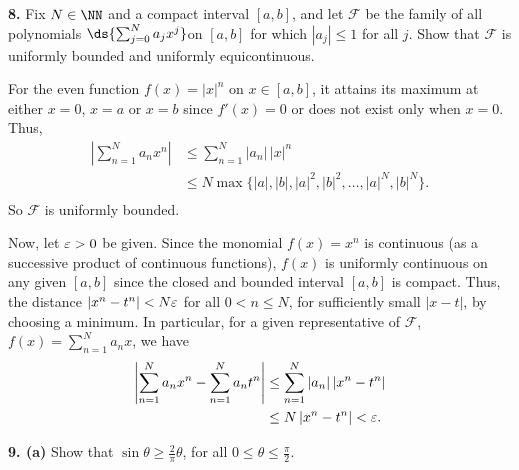 \documentclass{homework}
\begin{document}
{\bf 8.} Fix $N \in \NN$ and a compact interval $[a,b]$, and let $\mathcal F$ be the family of all polynomials $\ds{\sum_{j=0}^N a_jx^j}$on $[a,b]$ for which $|a_j| \le 1$ for all $j$. Show that $\mathcal F$ is uniformly bounded and uniformly equicontinuous.

\begin{solution}
For the even function $f(x) = |x|^n$ on $x\in[a,b]$, it attains its maximum at either $x = 0$, $x=a$ or $x=b$ since $f'(x) = 0$ or does not exist only when $x=0$.  Thus,
\begin{align*}
  \left| \sum_{n=1}^N a_n x^n \right| 
  &\le \sum_{n=1}^N |a_n|\, |x|^n\\
  &\le N \max\{|a|,|b|,|a|^2,|b|^2,\dots,|a|^N,|b|^N\}.\\
\end{align*}
So $\mathcal F$ is uniformly bounded.

Now, let $\varepsilon >0$ be given.  Since the monomial $f(x) = x^n$ is continuous (as
a successive product of continuous functions), $f(x)$ is uniformly continuous
on any given $[a,b]$ since the closed and bounded interval $[a,b]$ is compact. Thus, the distance $|x^n - t^n|< N\varepsilon$ for all $0<n\le N$, for sufficiently small $|x-t|$, by choosing a minimum.  
In particular, for a given representative of $\mathcal F$, $f(x) = \sum_{n=1}^N a_n x$, we have
\begin{align*}
  \left|\sum_{n=1}^N a_n x^n - \sum_{n=1}^N a_n t^n\right|
  &\le \sum_{n=1}^N |a_n| \left|x^n - t^n\right| \\
  &\le N \left|x^n - t^n\right| 
  < \varepsilon.
  \end{align*}
\end{solution}

{\bf 9. (a)} Show that $\sin \theta \ge \frac 2\pi\theta$, for all $0\le \theta \le \frac \pi 2$.
\end{document}
